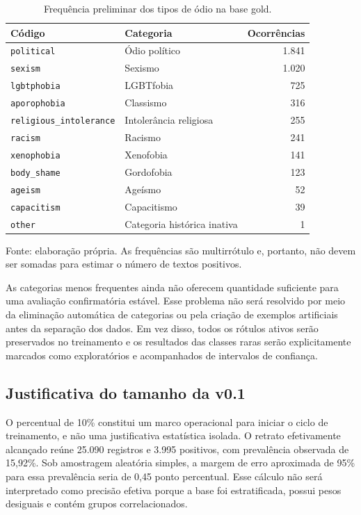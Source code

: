 \begin{table}[htbp]
    \centering
    \caption{Frequência preliminar dos tipos de ódio na base gold.}
    \label{tab:tipos-odio-preliminar}
    \begin{tabular}{llr}
        \toprule
        \textbf{Código} & \textbf{Categoria} & \textbf{Ocorrências} \\
        \midrule
        \texttt{political} & Ódio político & 1.841 \\
        \texttt{sexism} & Sexismo & 1.020 \\
        \texttt{lgbtphobia} & LGBTfobia & 725 \\
        \texttt{aporophobia} & Classismo & 316 \\
        \texttt{religious\_intolerance} & Intolerância religiosa & 255 \\
        \texttt{racism} & Racismo & 241 \\
        \texttt{xenophobia} & Xenofobia & 141 \\
        \texttt{body\_shame} & Gordofobia & 123 \\
        \texttt{ageism} & Ageísmo & 52 \\
        \texttt{capacitism} & Capacitismo & 39 \\
        \texttt{other} & Categoria histórica inativa & 1 \\
        \bottomrule
    \end{tabular}
    \par\smallskip
    {\footnotesize Fonte: elaboração própria. As frequências são multirrótulo e,
    portanto, não devem ser somadas para estimar o número de textos positivos.\par}
\end{table}

As categorias menos frequentes ainda não oferecem quantidade suficiente para
uma avaliação confirmatória estável. Esse problema não será resolvido por meio
da eliminação automática de categorias ou pela criação de exemplos artificiais
antes da separação dos dados. Em vez disso, todos os rótulos ativos serão
preservados no treinamento e os resultados das classes raras serão explicitamente
marcados como exploratórios e acompanhados de intervalos de confiança.

\subsection{Justificativa do tamanho da v0.1}

O percentual de 10\% constitui um marco operacional para iniciar o ciclo de
treinamento, e não uma justificativa estatística isolada. O retrato efetivamente
alcançado reúne 25.090 registros e 3.995 positivos, com prevalência observada de
15,92\%. Sob amostragem aleatória simples, a margem de erro aproximada de 95\%
para essa prevalência seria de 0,45 ponto percentual. Esse cálculo não será
interpretado como precisão efetiva porque a base foi estratificada, possui pesos
desiguais e contém grupos correlacionados.

